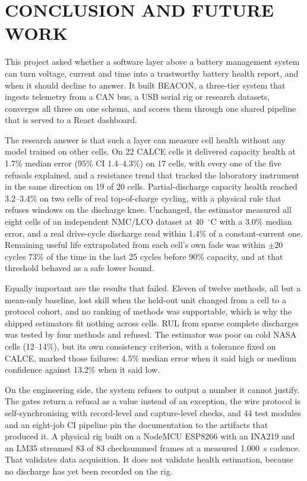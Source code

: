 \chapter{CONCLUSION AND FUTURE WORK}
\label{ch:conclusion}

This project asked whether a software layer above a battery management system can turn voltage, current and time into a trustworthy battery health report, and when it should decline to answer. It built BEACON, a three-tier system that ingests telemetry from a CAN bus, a USB serial rig or research datasets, converges all three on one schema, and scores them through one shared pipeline that is served to a React dashboard.

The research answer is that such a layer can measure cell health without any model trained on other cells. On 22 CALCE cells it delivered capacity health at 1.7\% median error (95\% CI 1.4--4.3\%) on 17 cells, with every one of the five refusals explained, and a resistance trend that tracked the laboratory instrument in the same direction on 19 of 20 cells. Partial-discharge capacity health reached 3.2--3.4\% on two cells of real top-of-charge cycling, with a physical rule that refuses windows on the discharge knee. Unchanged, the estimator measured all eight cells of an independent NMC/LCO dataset at 40~$^\circ$C with a 3.0\% median error, and a real drive-cycle discharge read within 1.4\% of a constant-current one. Remaining useful life extrapolated from each cell's own fade was within $\pm$20 cycles 73\% of the time in the last 25 cycles before 90\% capacity, and at that threshold behaved as a safe lower bound.

Equally important are the results that failed. Eleven of twelve methods, all but a mean-only baseline, lost skill when the held-out unit changed from a cell to a protocol cohort, and no ranking of methods was supportable, which is why the shipped estimators fit nothing across cells. RUL from sparse complete discharges was tested by four methods and refused. The estimator was poor on cold NASA cells (12--14\%), but its own consistency criterion, with a tolerance fixed on CALCE, marked those failures: 4.5\% median error when it said high or medium confidence against 13.2\% when it said low.

On the engineering side, the system refuses to output a number it cannot justify. The gates return a refusal as a value instead of an exception, the wire protocol is self-synchronising with record-level and capture-level checks, and 44 test modules and an eight-job CI pipeline pin the documentation to the artifacts that produced it. A physical rig built on a NodeMCU ESP8266 with an INA219 and an LM35 streamed 83 of 83 checksummed frames at a measured 1.000~s cadence. That validates data acquisition. It does not validate health estimation, because no discharge has yet been recorded on the rig.

